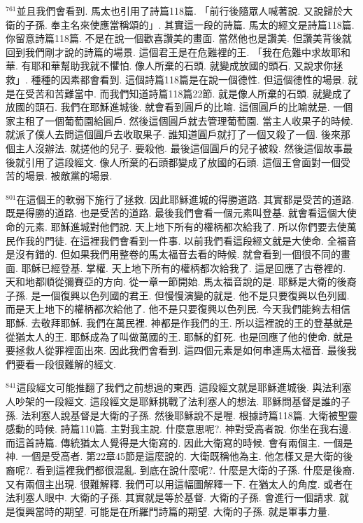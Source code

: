 \documentclass{book}
\begin{document}
$^{761}$並且我們會看到.
馬太也引用了詩篇118篇.
「前行後隨眾人喊著說.
又說歸於大衛的子孫.
奉主名來使應當稱頌的」.
其實這一段的詩篇.
馬太的經文是詩篇118篇.
你留意詩篇118篇.
不是在說一個歡喜讚美的畫面.
當然他也是讚美.
但讚美背後就回到我們剛才說的詩篇的場景.
這個君王是在危難裡的王.
「我在危難中求故耶和華.
有耶和華幫助我就不懼怕.
像人所棄的石頭.
就變成放國的頭石.
又說求你拯救」.
種種的因素都會看到.
這個詩篇118篇是在說一個德性.
但這個德性的場景.
就是在受苦和苦難當中.
而我們知道詩篇118篇22節.
就是像人所棄的石頭.
就變成了放國的頭石.
我們在耶穌進城後.
就會看到圓戶的比喻.
這個圓戶的比喻就是.
一個家主租了一個葡萄園給圓戶.
然後這個圓戶就去管理葡萄園.
當主人收果子的時候.
就派了僕人去問這個圓戶去收取果子.
誰知道圓戶就打了一個又殺了一個.
後來那個主人沒辦法.
就搓他的兒子.
要殺他.
最後這個圓戶的兒子被殺.
然後這個故事最後就引用了這段經文.
像人所棄的石頭都變成了放國的石頭.
這個王會面對一個受苦的場景.
被敵黨的場景.

$^{801}$在這個王的軟弱下施行了拯救.
因此耶穌進城的得勝道路.
其實都是受苦的道路.
既是得勝的道路.
也是受苦的道路.
最後我們會看一個元素叫登基.
就會看這個大使命的元素.
耶穌進城對他們說.
天上地下所有的權柄都次給我了.
所以你們要去使萬民作我的門徒.
在這裡我們會看到一件事.
以前我們看這段經文就是大使命.
全福音是沒有錯的.
但如果我們用整卷的馬太福音去看的時候.
就會看到一個很不同的畫面.
耶穌已經登基.
掌權.
天上地下所有的權柄都次給我了.
這是回應了古卷裡的.
天和地都順從彌賽亞的方向.
從一章一節開始.
馬太福音說的是.
耶穌是大衛的後裔子孫.
是一個復興以色列國的君王.
但慢慢演變的就是.
他不是只要復興以色列國.
而是天上地下的權柄都次給他了.
他不是只要復興以色列民.
今天我們能夠去相信耶穌.
去敬拜耶穌.
我們在萬民裡.
神都是作我們的王.
所以這裡說的王的登基就是從猶太人的王.
耶穌成為了叫做萬國的王.
耶穌的釘死.
也是回應了他的使命.
就是要拯救人從罪裡面出來.
因此我們會看到.
這四個元素是如何串連馬太福音.
最後我們要看一段很難解的經文.

$^{841}$這段經文可能推翻了我們之前想過的東西.
這段經文就是耶穌進城後.
與法利塞人吵架的一段經文.
這段經文是耶穌挑戰了法利塞人的想法.
耶穌問基督是誰的子孫.
法利塞人說基督是大衛的子孫.
然後耶穌說不是喔.
根據詩篇118篇.
大衛被聖靈感動的時候.
詩篇110篇.
主對我主說.
什麼意思呢?.
神對受高者說.
你坐在我右邊.
而這首詩篇.
傳統猶太人覺得是大衛寫的.
因此大衛寫的時候.
會有兩個主.
一個是神.
一個是受高者.
第22章45節是這麼說的.
大衛既稱他為主.
他怎樣又是大衛的後裔呢?.
看到這裡我們都很混亂.
到底在說什麼呢?.
什麼是大衛的子孫.
什麼是後裔.
又有兩個主出現.
很難解釋.
我們可以用這幅圖解釋一下.
在猶太人的角度.
或者在法利塞人眼中.
大衛的子孫.
其實就是等於基督.
大衛的子孫.
會進行一個請求.
就是復興當時的期望.
可能是在所羅門詩篇的期望.
大衛的子孫.
就是軍事力量.
\end{document}
